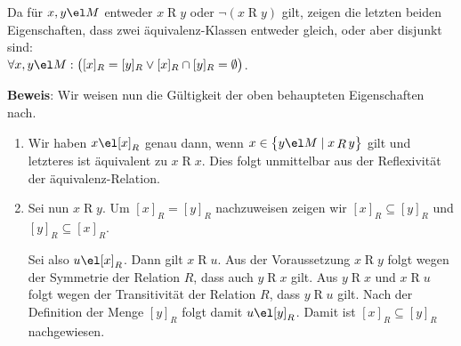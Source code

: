 \remark
Da f\"{u}r $x,y\el M$ entweder $x \mathop{R} y$ oder $\neg (x \mathop{R} y)$ gilt, zeigen die
letzten beiden Eigenschaften, dass zwei \"{a}quivalenz-Klassen entweder gleich,
oder aber disjunkt sind:
\\[0.2cm]
\hspace*{1.3cm}
$\forall x, y \el M: \bigl([x]_R = [y]_R \vee [x]_R \cap [y]_R = \emptyset\bigr)$.
\vspace*{0.1cm}

\noindent
\textbf{Beweis}:  Wir weisen nun die G\"{u}ltigkeit der oben behaupteten Eigenschaften nach.
\begin{enumerate}
\item Wir haben $x \el [x]_R$ genau dann, wenn 
      $x \in \bigl\{ y \el M \mid x \mathop{R} y \bigr\}$ gilt und letzteres ist
      \"{a}quivalent zu $x \mathop{R} x$.
      Dies folgt unmittelbar aus der Reflexivit\"{a}t der \"{a}quivalenz-Relation.
\item Sei nun $x \mathop{R} y$.  Um $[x]_R = [y]_R$ nachzuweisen zeigen wir
      $[x]_R \subseteq [y]_R$ und $[y]_R \subseteq [x]_R$.

      Sei also 
      $u \el [x]_R$.  Dann gilt $x \mathop{R} u$.  Aus der Voraussetzung
      $x \mathop{R} y$ folgt wegen der Symmetrie der Relation $R$, dass auch
      $y \mathop{R} x$ gilt.  Aus 
      $y \mathop{R} x$ und $x \mathop{R} u$ folgt wegen der Transitivit\"{a}t der Relation
      $R$, dass $y \mathop{R} u$ gilt.  Nach der Definition der
      Menge $[y]_R$ folgt damit $u \el [y]_R$. 
      Damit ist $[x]_R \subseteq [y]_R$ nachgewiesen.


\end{enumerate}
